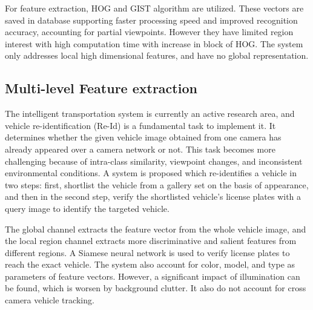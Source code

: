 For feature extraction, HOG and GIST algorithm are utilized. These vectors are saved in database supporting faster processing speed and improved recognition accuracy, accounting for partial viewpoints. However they have limited region interest with high computation time with increase in block of HOG. The system only addresses local high dimensional features, and have no global representation.

\subsection{Multi-level Feature extraction}
The intelligent transportation system is currently an active research area, and vehicle
re-identification (Re-Id) is a fundamental task to implement it. It determines whether the given vehicle image obtained from one camera has already appeared over a camera network or not. This task becomes more challenging because of intra-class similarity,
viewpoint changes, and inconsistent environmental conditions. A system \cite{cai2019efficient} is proposed which re-identifies a vehicle in two steps: first, shortlist the vehicle from a gallery set on the basis of appearance, and then in the second step, verify the shortlisted vehicle’s license plates with a query image to identify the targeted vehicle. 

The global channel extracts the feature vector from the whole vehicle image, and the local region channel extracts more discriminative and salient features from different regions. A Siamese neural network is used to verify license plates to reach the
exact vehicle. The system also account for color, model, and type as parameters of feature vectors. However, a significant impact of illumination can be found, which is worsen by background clutter. It also do not account for cross camera vehicle tracking.

